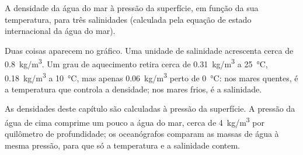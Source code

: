 \begin{omfigure}

{\small A densidade da água do mar à pressão da superfície, em função da sua
temperatura, para três salinidades (calculada pela equação de estado
internacional da água do mar).}
\end{omfigure}

Duas coisas aparecem no gráfico. Uma unidade de salinidade acrescenta cerca
de \qty{0.8}{kg/m^3}. Um grau de aquecimento retira cerca de
\qty{0.31}{kg/m^3} a \qty{25}{\degreeCelsius}, \qty{0.18}{kg/m^3} a
\qty{10}{\degreeCelsius}, mas apenas \qty{0.06}{kg/m^3} perto de
\qty{0}{\degreeCelsius}: nos mares quentes, é a temperatura que controla a
densidade; nos mares frios, é a salinidade.

\begin{remark}
As densidades deste capítulo são calculadas à pressão da superfície. A
pressão da água de cima comprime um pouco a água do mar, cerca de
\qty{4}{kg/m^3} por quilômetro de profundidade; os oceanógrafos comparam as
massas de água à mesma pressão, para que só a temperatura e a salinidade
contem.
\end{remark}

